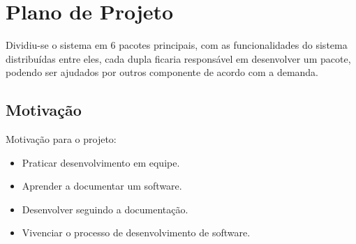\section{Plano de Projeto}

Dividiu-se o sistema em 6 pacotes principais, com as funcionalidades do sistema distribuídas entre eles, cada dupla ficaria responsável em desenvolver um pacote, podendo ser ajudados por outros componente de acordo com a demanda.

\subsection{Motivação}

Motivação para o projeto:

\begin{itemize}
\item Praticar desenvolvimento em equipe.
\item Aprender a documentar um software.
\item Desenvolver seguindo a documentação.
\item Vivenciar o processo de desenvolvimento de software.
\end{itemize}

